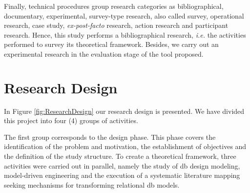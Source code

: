 Finally, technical procedures group research categories as bibliographical, documentary, experimental, survey-type research, also called survey, operational research, case study, \textit{ex-post-facto} research, action research and participant research.
Hence, this study performs a bibliographical research, \textit{i.e.} the activities performed to survey its theoretical framework. 
Besides, we carry out an experimental research in the evaluation stage of the tool proposed.

\section{Research Design}\label{met:researchdesign}

In Figure \ref{fig:ResearchDesign} our research design is presented.
We have divided this project into four (4) groups of activities.

The first group corresponds to the design phase.
This phase covers the identification of the problem and motivation, the establishment of objectives and the definition of the study structure.
To create a theoretical framework, three activities were carried out in parallel, namely the study of \ac{db} design modeling, model-driven engineering and the execution of a systematic literature mapping seeking mechanisms for transforming relational \ac{db} models.

